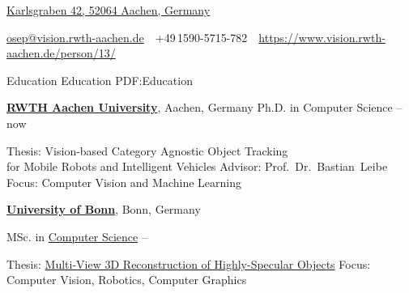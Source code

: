 \documentclass[letterpaper,MMMyyyy,nonstopmode]{simpleresumecv}
\newcommand{\CVAuthor}{Aljo\v{s}a O\v{s}ep}
\newcommand{\CVWebpage}{https://www.vision.rwth-aachen.de/person/13/}
\begin{document}

\Title{\CVAuthor}

\begin{SubTitle}
\href{https://www.google.com/maps/place/Karlsgraben+42,+52064+Aachen}
{Karlsgraben 42, 52064 Aachen, Germany}
\par
\href{mailto:osep@vision.rwth-aachen.de}
{osep@vision.rwth-aachen.de}
\,\SubBulletSymbol\,
+49\,1590-5715-782
\,\SubBulletSymbol\,
\href{\CVWebpage}
{\url{\CVWebpage}}
\end{SubTitle}

\begin{Body}


\Section
{Education}
{Education}
{PDF:Education}


\Entry
\href{http://www.rwth-aachen.de}
{\textbf{RWTH Aachen University}},
Aachen, Germany
\Gap
\BulletItem
Ph.D. in Computer Science
\hfill
{} --
now
\begin{Detail}
\SubBulletItem
Thesis:
{Vision-based Category Agnostic Object Tracking \\for Mobile Robots and Intelligent Vehicles}
\SubBulletItem
Advisor:
Prof.~Dr.~Bastian~Leibe
\SubBulletItem
Focus:
Computer Vision and Machine Learning
\end{Detail}
%



\BigGap
\Entry
\href{https://www.uni-bonn.de/}
{\textbf{University of Bonn}},
Bonn, Germany

\Gap
\BulletItem
MSc. in
\href{https://www.informatik.uni-bonn.de/de/fuer-studierende/master-of-science-in-computer-science}
{Computer Science}
\hfill
{} --
\begin{Detail}
\SubBulletItem
Thesis:
\href{https://www.vision.rwth-aachen.de/media/papers/thesis_doc.pdf}
{Multi-View 3D Reconstruction of Highly-Specular Objects}
\SubBulletItem
Focus:
Computer Vision, Robotics, Computer Graphics
%
\end{Detail}


\end{Body}
\end{document}
